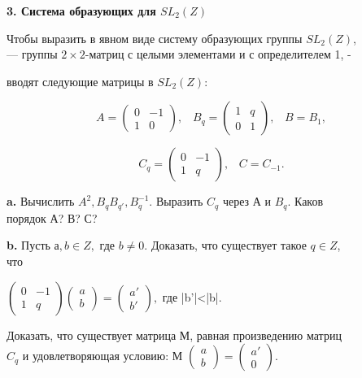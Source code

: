 \documentclass{../template/mai_book}
\begin{document}
\medskip

{\noindent \bf 3. Система образующих для $SL_2(Z)$} 

\medskip

Чтобы выразить в явном виде систему образующих группы $SL_2(Z)$,\\
— группы $2 \times 2$-матриц с целыми элементами и с определителем 1, -

\pagebreak


вводят следующие матрицы в $SL_2(\mathit{Z})$: 

$$A = \begin{pmatrix}
0 & -1\\ 1 & 0
\end{pmatrix},\;\;\;
B_q = \begin{pmatrix}
1 & q\\ 0 & 1
\end{pmatrix}, \;\;\; B=B_1,
$$

$$C_q = \begin{pmatrix}
0 & -1\\ 1 & q
\end{pmatrix},\;\;\;C = C_{-1}.$$

\medskip

{\bf a.} Вычислить $A^2, B_qB_{q'}, B_q^{-1}.$ Выразить $C_q$ через А и $B_q$. Каков\\ 
порядок $А$? $В$? $С$?

\medskip

{\bf b.} Пусть $а,b \in \mathit{Z},$ где $b\ne 0$. Доказать, что существует такое $q \in \mathit{Z}$,\\ 
что 

{\begin{center}
$\begin{pmatrix}
0 & -1\\ 1 & q
\end{pmatrix}\begin{pmatrix}
a\\ b
\end{pmatrix}
=\begin{pmatrix}
a'\\ b'
\end{pmatrix},$\;\;\; где |b'|<|b|.
\end{center}}

 
Доказать, что существует матрица М, равная произведению матриц \\
$C_q$ и удовлетворяющая условию: М $
\begin{pmatrix}
a\\ b
\end{pmatrix}
=\begin{pmatrix}
a'\\ 0 
\end{pmatrix}.
$ 
\end{document}
